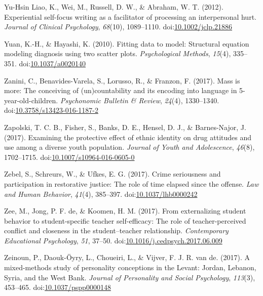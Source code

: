 \documentclass[english,man]{apa6}
\theoremstyle{definition}
\theoremstyle{definition}
\theoremstyle{definition}
\theoremstyle{remark}
\begin{document}
\hypertarget{ref-Yu-HsinLiao2012}{}
Yu-Hsin Liao, K., Wei, M., Russell, D. W., \& Abraham, W. T. (2012).
Experiential self-focus writing as a facilitator of processing an
interpersonal hurt. \emph{Journal of Clinical Psychology},
\emph{68}(10), 1089--1110.
doi:\href{https://doi.org/10.1002/jclp.21886}{10.1002/jclp.21886}

\hypertarget{ref-Yuan2010}{}
Yuan, K.-H., \& Hayashi, K. (2010). Fitting data to model: Structural
equation modeling diagnosis using two scatter plots. \emph{Psychological
Methods}, \emph{15}(4), 335--351.
doi:\href{https://doi.org/10.1037/a0020140}{10.1037/a0020140}

\hypertarget{ref-Zanini2016}{}
Zanini, C., Benavides-Varela, S., Lorusso, R., \& Franzon, F. (2017).
Mass is more: The conceiving of (un)countability and its encoding into
language in 5-year-old-children. \emph{Psychonomic Bulletin \& Review},
\emph{24}(4), 1330--1340.
doi:\href{https://doi.org/10.3758/s13423-016-1187-2}{10.3758/s13423-016-1187-2}

\hypertarget{ref-Zapolski2017}{}
Zapolski, T. C. B., Fisher, S., Banks, D. E., Hensel, D. J., \&
Barnes-Najor, J. (2017). Examining the protective effect of ethnic
identity on drug attitudes and use among a diverse youth population.
\emph{Journal of Youth and Adolescence}, \emph{46}(8), 1702--1715.
doi:\href{https://doi.org/10.1007/s10964-016-0605-0}{10.1007/s10964-016-0605-0}

\hypertarget{ref-Zebel2017}{}
Zebel, S., Schreurs, W., \& Ufkes, E. G. (2017). Crime seriousness and
participation in restorative justice: The role of time elapsed since the
offense. \emph{Law and Human Behavior}, \emph{41}(4), 385--397.
doi:\href{https://doi.org/10.1037/lhb0000242}{10.1037/lhb0000242}

\hypertarget{ref-Zee2017}{}
Zee, M., Jong, P. F. de, \& Koomen, H. M. (2017). From externalizing
student behavior to student-specific teacher self-efficacy: The role of
teacher-perceived conflict and closeness in the student--teacher
relationship. \emph{Contemporary Educational Psychology}, \emph{51},
37--50.
doi:\href{https://doi.org/10.1016/j.cedpsych.2017.06.009}{10.1016/j.cedpsych.2017.06.009}

\hypertarget{ref-Zeinoun2017}{}
Zeinoun, P., Daouk-Öyry, L., Choueiri, L., \& Vijver, F. J. R. van de.
(2017). A mixed-methods study of personality conceptions in the Levant:
Jordan, Lebanon, Syria, and the West Bank. \emph{Journal of Personality
and Social Psychology}, \emph{113}(3), 453--465.
doi:\href{https://doi.org/10.1037/pspp0000148}{10.1037/pspp0000148}
\end{document}
